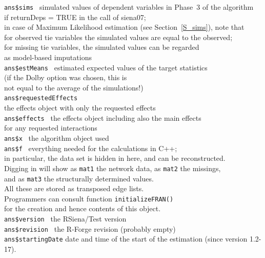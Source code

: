 \documentclass[a4paper,fleqn,11pt]{article}
\newcommand{\+}{\, + \,}
\begin{document}
\begin{tabbing}
 \texttt{ans\$sims }         \> simulated values of dependent variables
                                      in Phase~3 of the algorithm     \\
                             \>  if \textsf{returnDeps = TRUE}
                                        in the call of \textsf{siena07}; \\
                             \> in case of Maximum Likelihood estimation (see Section~\ref{S_sims}), note that \\
                             \> for observed tie variables the simulated values are
                             equal to the observed; \\
                             \> for missing tie variables, the simulated values can be regarded \\
                             \> as model-based imputations \\
 \texttt{ans\$estMeans }     \> estimated expected values of the target statistics\\
                             \> (if the Dolby option was chosen, this is \\
                             \> not equal to the average of the simulations!)\\
 \texttt{ans\$requestedEffects }  \\
                            \> the effects object with only the requested effects\\
 \texttt{ans\$effects }      \> the effects object including also the main effects\\
                                \> for any requested interactions\\
 \texttt{ans\$x }            \> the algorithm object used\\
 \texttt{ans\$f }            \> everything needed for the calculations in C++;\\
                             \> in particular, the data set is hidden in here,
                                and can be reconstructed.\\
                             \> Digging in will show as \texttt{mat1} the network data,
                                 as \texttt{mat2} the missings, \\
                             \>   and as \texttt{mat3} the structurally determined values.\\
                             \> All these are stored as transposed edge lists.\\
                             \> Programmers can consult function \texttt{initializeFRAN()}\\
                             \> for the creation and hence contents of this object.\\
 \texttt{ans\$version }      \> the \textsf{RSiena/Test} version\\
 \texttt{ans\$revision }     \> the \textsf{R-Forge} revision (probably empty)\\
 \texttt{ans\$startingDate}  \> date and time of the start of the estimation (since version 1.2-17).\\

\end{tabbing}
\end{document}
